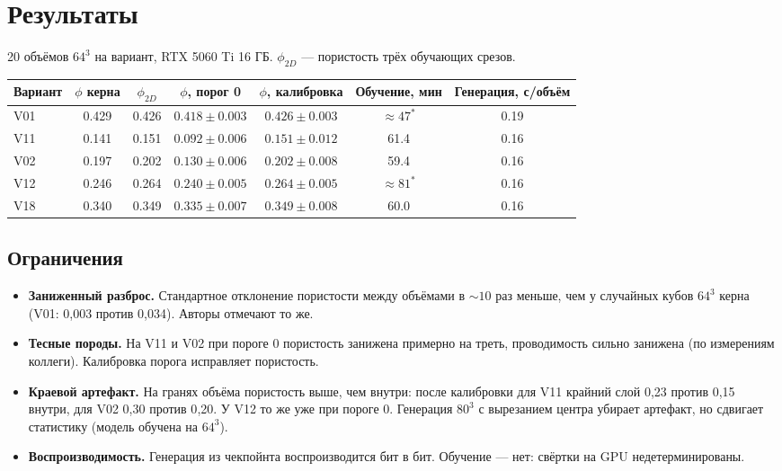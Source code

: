 \documentclass[11pt,a4paper]{article}
\begin{document}
\section{Результаты}

20 объёмов $64^3$ на вариант, RTX 5060 Ti 16 ГБ. $\phi_{2D}$ — пористость трёх обучающих срезов.

\begin{center}
\small
\begin{tabular}{@{}lcccccc@{}}
\toprule
Вариант & $\phi$ керна & $\phi_{2D}$ & $\phi$, порог 0 & $\phi$, калибровка & Обучение, мин & Генерация, с/объём \\
\midrule
V01 & 0.429 & 0.426 & $0.418\pm0.003$ & $0.426\pm0.003$ & $\approx47^*$ & 0.19 \\
V11 & 0.141 & 0.151 & $0.092\pm0.006$ & $0.151\pm0.012$ & 61.4 & 0.16 \\
V02 & 0.197 & 0.202 & $0.130\pm0.006$ & $0.202\pm0.008$ & 59.4 & 0.16 \\
V12 & 0.246 & 0.264 & $0.240\pm0.005$ & $0.264\pm0.005$ & $\approx81^*$ & 0.16 \\
V18 & 0.340 & 0.349 & $0.335\pm0.007$ & $0.349\pm0.008$ & 60.0 & 0.16 \\
\bottomrule
\end{tabular}
\end{center}

\subsection{Ограничения}\label{sec:limits}
\begin{itemize}
  \item \textbf{Заниженный разброс.} Стандартное отклонение пористости между объёмами в $\sim10$ раз меньше,
        чем у случайных кубов $64^3$ керна (V01: 0{,}003 против 0{,}034). Авторы отмечают то же.
  \item \textbf{Тесные породы.} На V11 и V02 при пороге 0 пористость занижена примерно на треть, проводимость
        сильно занижена (по измерениям коллеги). Калибровка порога исправляет пористость.
  \item \textbf{Краевой артефакт.} На гранях объёма пористость выше, чем внутри: после калибровки для V11
        крайний слой 0{,}23 против 0{,}15 внутри, для V02 0{,}30 против 0{,}20. У V12 то же уже при
        пороге 0. Генерация $80^3$ с вырезанием центра убирает артефакт, но сдвигает статистику
        (модель обучена на $64^3$).
  \item \textbf{Воспроизводимость.} Генерация из чекпойнта воспроизводится бит в бит. Обучение — нет:
        свёртки на GPU недетерминированы.
\end{itemize}
\end{document}
